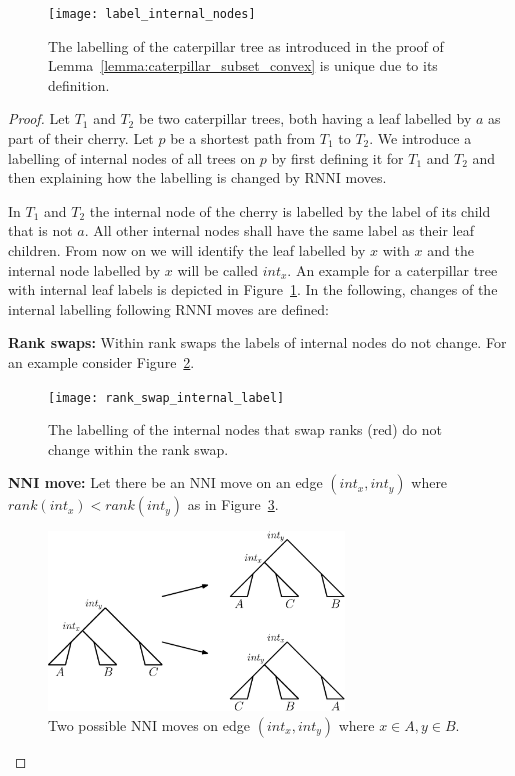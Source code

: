 \documentclass[11pt, a4paper]{article}
\newcommand{\nni}{\mathrm{NNI}}
\newcommand{\rnni}{\mathrm{RNNI}}
\begin{document}
\begin{figure}[h]
	\centering
	\texttt{[image: label\_internal\_nodes]}
	\caption{The labelling of the caterpillar tree as introduced in the proof of Lemma~\ref{lemma:caterpillar_subset_convex} is unique due to its definition.
	}
	\label{label_internal_nodes}
\end{figure}

\begin{proof}
	Let $T_1$ and $T_2$ be two caterpillar trees, both having a leaf labelled by $a$ as part of their cherry.
	Let $p$ be a shortest path from $T_1$ to $T_2$.
	We introduce a labelling of internal nodes of all trees on $p$ by first defining it for $T_1$ and $T_2$ and then explaining how the labelling is changed by $\rnni$ moves.

	In $T_1$ and $T_2$ the internal node of the cherry is labelled by the label of its child that is not $a$.
	All other internal nodes shall have the same label as their leaf children.
	From now on we will identify the leaf labelled by $x$ with $x$ and the internal node labelled by $x$ will be called $int_x$.
	An example for a caterpillar tree with internal leaf labels is depicted in Figure~\ref{label_internal_nodes}.
	In the following, changes of the internal labelling following $\rnni$ moves are defined:

	\textbf{Rank swaps:}
	Within rank swaps the labels of internal nodes do not change.
	For an example consider Figure~\ref{fig:rank_swap_internal_label}.

	\begin{figure}[H]
		\centering
		\texttt{[image: rank\_swap\_internal\_label]}
		\caption{The labelling of the internal nodes that swap ranks (red) do not change within the rank swap.
		}
		\label{fig:rank_swap_internal_label}
	\end{figure}

	\textbf{NNI move:}
	Let there be an $\nni$ move on an edge $(int_x, int_y)$ where $rank(int_x) < rank(int_y)$ as in Figure~\ref{fig:nni_moves}.

	\begin{figure}[H]
		\centering
		\includegraphics[width=0.7\textwidth]{nni_moves_internal_label}
		\caption{Two possible $\nni$ moves on edge $(int_x, int_y)$ where $x \in A, y \in B$.
		}
		\label{fig:nni_moves}
	\end{figure}


\end{proof}
\end{document}
